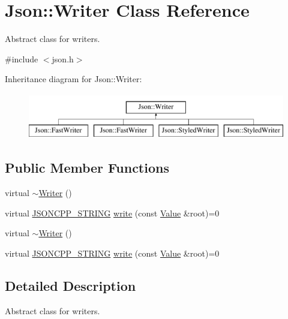 \hypertarget{class_json_1_1_writer}{}\section{Json\+:\+:Writer Class Reference}
\label{class_json_1_1_writer}


Abstract class for writers.  




{\ttfamily \#include $<$json.\+h$>$}

Inheritance diagram for Json\+:\+:Writer\+:\begin{figure}[H]
\begin{center}
\leavevmode
\includegraphics[height=2.000000cm]{class_json_1_1_writer}
\end{center}
\end{figure}
\subsection*{Public Member Functions}
\begin{DoxyCompactItemize}
\item 
virtual \hyperlink{class_json_1_1_writer_a3e618564336f26b14921f0d840db668c}{$\sim$\+Writer} ()
\item 
virtual \hyperlink{config_8h_a1e723f95759de062585bc4a8fd3fa4be}{J\+S\+O\+N\+C\+P\+P\+\_\+\+S\+T\+R\+I\+NG} \hyperlink{class_json_1_1_writer_a61c55882b82c7651d0b9b683c6d3f371}{write} (const \hyperlink{class_json_1_1_value}{Value} \&root)=0
\item 
virtual \hyperlink{class_json_1_1_writer_a1414aeff9958fa970c6ac2e352786186}{$\sim$\+Writer} ()
\item 
virtual \hyperlink{config_8h_a1e723f95759de062585bc4a8fd3fa4be}{J\+S\+O\+N\+C\+P\+P\+\_\+\+S\+T\+R\+I\+NG} \hyperlink{class_json_1_1_writer_a61c55882b82c7651d0b9b683c6d3f371}{write} (const \hyperlink{class_json_1_1_value}{Value} \&root)=0
\end{DoxyCompactItemize}


\subsection{Detailed Description}
Abstract class for writers. 

